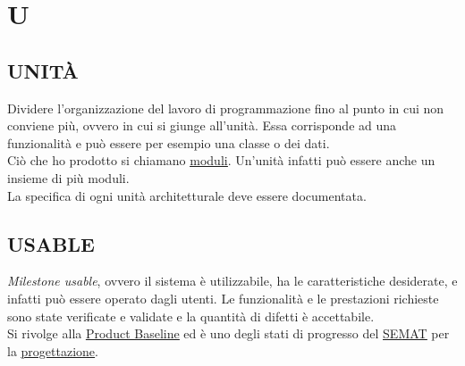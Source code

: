 \newpage
	\section{U} \label{sec:U}

		\subsection{UNITÀ}	 \label{unita}
		Dividere l'organizzazione del lavoro di programmazione fino al punto in cui non conviene più, ovvero in cui si giunge all'unità.
		Essa corrisponde ad una funzionalità e può essere per esempio una classe o dei dati. \\
		Ciò che ho prodotto si chiamano \underline{\hyperref[moduli]{moduli}}.
		Un'unità infatti può essere anche un insieme di più moduli. \\
		La specifica di ogni unità architetturale deve essere documentata.

		\subsection{USABLE}		\label{usable}
		\textit{Milestone usable}, ovvero il sistema è utilizzabile, ha le caratteristiche desiderate, e infatti può essere operato dagli utenti. Le funzionalità e le prestazioni richieste sono state verificate e validate e la quantità di difetti è accettabile. \\
		Si rivolge alla \underline{\hyperref[productbaseline]{Product Baseline}} ed è uno degli stati di progresso del \underline{\hyperref[semat]{SEMAT}} per la \underline{\hyperref[progettazione]{progettazione}}.
